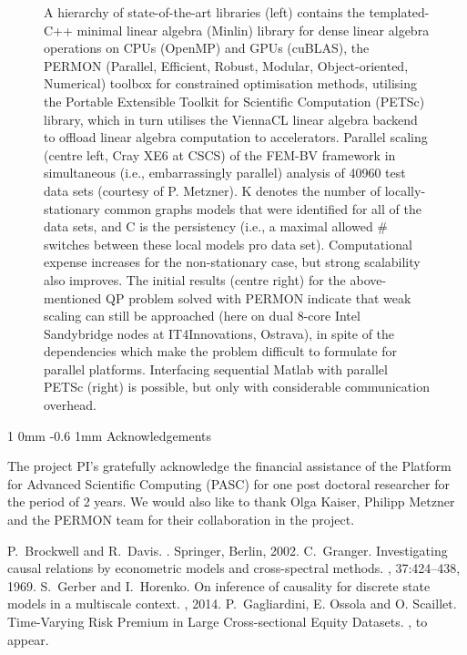 \documentclass[a0,portrait]{a0poster}
\makeatletter
\renewcommand{\section}{\@startsection
        {section}%
        {1}%
        {0mm}%
        {-0.6\baselineskip}%
        {1mm}%
        {\Large\color{NTNUBlue}\bfseries}}%
\makeatother
\begin{document}
\begin{multicols}{2}
\begin{figure}[H]
\begin{center}
 \caption{A hierarchy of state-of-the-art libraries (left) contains the templated-C++ minimal linear algebra (Minlin) library for dense linear algebra operations on CPUs (OpenMP) and GPUs (cuBLAS), the PERMON (Parallel, Efficient, Robust, Modular, Object-oriented, Numerical) toolbox for constrained optimisation methods, utilising the Portable Extensible Toolkit for Scientific Computation (PETSc) library, which in turn utilises the ViennaCL linear algebra backend  to offload linear algebra computation to accelerators. Parallel scaling (centre left, Cray XE6 at CSCS) of the FEM-BV framework in simultaneous (i.e., embarrassingly parallel) analysis of 40960 test data sets (courtesy of P. Metzner). K denotes the number of locally-stationary common graphs models that were identified for all of the data sets, and C is the persistency (i.e., a maximal allowed \# switches between these local models pro data set). Computational expense increases for the non-stationary case, but strong scalability also improves.   The initial results (centre right) for the above-mentioned QP problem solved with PERMON indicate that weak scaling can still be approached (here on dual 8-core Intel Sandybridge nodes at IT4Innovations, Ostrava), in spite of the dependencies which make the problem difficult to formulate for parallel platforms. Interfacing sequential Matlab with parallel PETSc (right) is possible, but only with considerable communication overhead. }
 \end{center} \label{fig:Scaling}
\end{figure}

\vspace{-1.0cm}
%
\section{Acknowledgements}
\noindent
\par  The project PI's gratefully acknowledge the financial assistance of the Platform for Advanced Scientific Computing (PASC) for one post doctoral researcher for the period of 2 years. We would also like to thank Olga Kaiser, Philipp Metzner and the PERMON team for their collaboration in the project.

\par


\begin{thebibliography}{10}
P.~Brockwell and R.~Davis.
.
\newblock Springer, Berlin, 2002.
C.~Granger.
\newblock Investigating causal relations by econometric models and
  cross-spectral methods.
, 37:424--438, 1969.
S.~Gerber and I.~Horenko.
\newblock On inference of causality for discrete state models in a multiscale
  context.
, 2014.
P.~Gagliardini, E. Ossola and O. Scaillet.
\newblock Time-Varying Risk Premium in Large Cross-sectional Equity Datasets.
, to appear.
 

\end{thebibliography}

\end{multicols}
\end{document}
